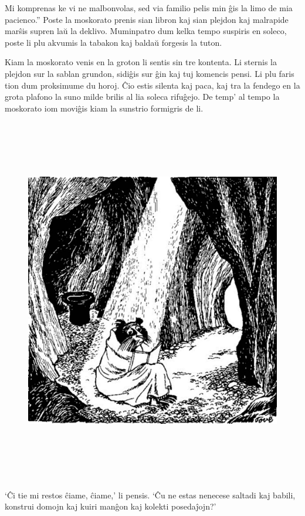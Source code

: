 Mi komprenas ke vi ne malbonvolas, sed via familio pelis min ĝis la limo de mia pacienco.'' Poste la moskorato prenis sian libron kaj sian plejdon kaj malrapide marŝis supren laŭ la deklivo. Muminpatro dum kelka tempo suspiris en soleco, poste li plu akvumis la tabakon kaj baldaŭ forgesis la tuton.

Kiam la moskorato venis en la groton li sentis sin tre kontenta. Li sternis la plejdon sur la sablan grundon, sidiĝis sur ĝin kaj tuj komencis pensi. Li plu faris tion dum proksimume du horoj. Ĉio estis silenta kaj paca, kaj tra la fendego en la grota plafono la suno milde brilis al lia soleca rifuĝejo. De temp' al tempo la moskorato iom moviĝis kiam la sunstrio formigris de li.

\begin{figure}[htbp]
\centering
\includegraphics[width=459pt,height=455pt]{_13.jpg}
\caption{}
\label{_13}
\end{figure}

`Ĉi tie mi restos ĉiame, ĉiame,' li pensis. `Ĉu ne estas nenecese saltadi kaj babili, konstrui domojn kaj kuiri manĝon kaj kolekti posedaĵojn?'

